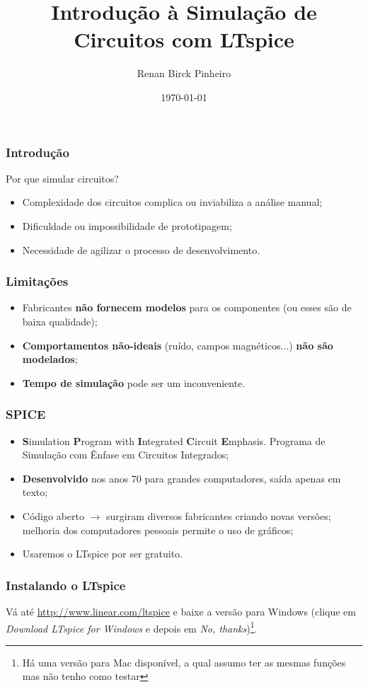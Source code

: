 \documentclass{beamer}
\begin{document}
\title{Introdução à Simulação de Circuitos com LTspice}
\author{Renan Birck Pinheiro}
\date{\today} 

\frame{\titlepage} 


\begin{frame}
\frametitle{Introdução} 
Por que simular circuitos?
\begin{itemize}
\item Complexidade dos circuitos complica ou inviabiliza a análise manual;
\item Dificuldade ou impossibilidade de prototipagem;
\item Necessidade de agilizar o processo de desenvolvimento.
\end{itemize}
\end{frame}

\begin{frame}
\frametitle{Limitações}
\begin{itemize}
\item Fabricantes \textbf{não fornecem modelos} para os componentes (ou esses são de baixa qualidade);
\item \textbf{Comportamentos não-ideais} (ruído, campos magnéticos...) \textbf{não são modelados};
\item \textbf{Tempo de simulação} pode ser um inconveniente.
\end{itemize}
\end{frame}

\begin{frame}
\frametitle{SPICE}
\begin{itemize}
\item \textbf{S}imulation \textbf{P}rogram with \textbf{I}ntegrated \textbf{C}ircuit \textbf{E}mphasis. Programa de Simulação com Ênfase em Circuitos Integrados;
\item \textbf{Desenvolvido} nos anos 70 para grandes computadores, saída apenas em texto;
\item Código aberto $\rightarrow$ surgiram diversos fabricantes criando novas versões; melhoria dos computadores pessoais permite o uso de gráficos;
\item Usaremos o LTspice por ser gratuito.
\end{itemize}
\end{frame}

\begin{frame}
\frametitle{Instalando o LTspice}
Vá até \url{http://www.linear.com/ltspice} e baixe a versão para Windows (clique em \textit{Download LTspice for Windows} e depois em \textit{No, thanks})\footnote{Há uma versão para Mac disponível, a qual assumo ter as mesmas funções mas não tenho como testar}.
\end{frame}
\end{document}
